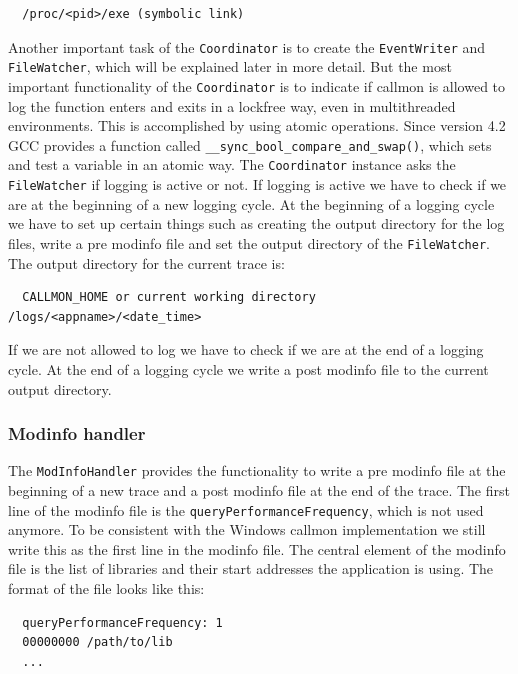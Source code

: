 \begin{verbatim}
  /proc/<pid>/exe (symbolic link)
\end{verbatim}

Another important task of the \verb=Coordinator= is to create the \verb=EventWriter= and \verb=FileWatcher=, which will be explained later in more detail. But the most important functionality of the \verb=Coordinator= is to indicate if callmon is allowed to log the function enters and exits in a lockfree way, even in multithreaded environments. This is accomplished by using atomic operations. Since version 4.2 GCC provides a function called \verb=__sync_bool_compare_and_swap()=, which sets and test a variable in an atomic way. The \verb=Coordinator= instance asks the \verb=FileWatcher= if logging is active or not. If logging is active we have to check if we are at the beginning of a new logging cycle. At the beginning of a logging cycle we have to set up certain things such as creating the output directory for the log files, write a pre modinfo file and set the output directory of the \verb=FileWatcher=. The output directory for the current trace is:

\begin{verbatim}
  CALLMON_HOME or current working directory /logs/<appname>/<date_time>
\end{verbatim}

If we are not allowed to log we have to check if we are at the end of a logging cycle. At the end of a logging cycle we write a post modinfo file to the current output directory.

\subsubsection{Modinfo handler}

The \verb=ModInfoHandler= provides the functionality to write a pre modinfo file at the beginning of a new trace and a post modinfo file at the end of the trace. The first line of the modinfo file is the \verb=queryPerformanceFrequency=, which is not used anymore. To be consistent with the Windows callmon implementation we still write this as the first line in the modinfo file. The central element of the modinfo file is the list of libraries and their start addresses the application is using. The format of the file looks like this:

\begin{verbatim}
  queryPerformanceFrequency: 1
  00000000 /path/to/lib
  ...
\end{verbatim}

